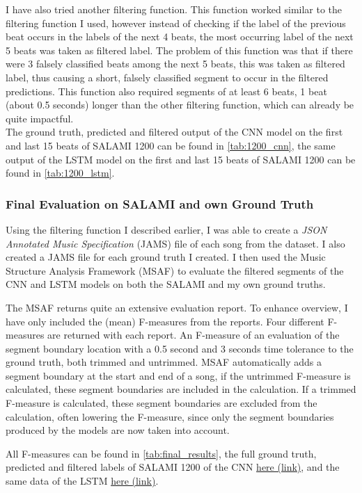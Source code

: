 I have also tried another filtering function. This function worked similar to the filtering function I used, however instead of checking if the label of the previous beat occurs in the labels of the next 4 beats, the most occurring label of the next 5 beats was taken as filtered label. The problem of this function was that if there were 3 falsely classified beats among the next 5 beats, this was taken as filtered label, thus causing a short, falsely classified segment to occur in the filtered predictions. This function also required segments of at least 6 beats, 1 beat (about 0.5 seconds) longer than the other filtering function, which can already be quite impactful.\\

The ground truth, predicted and filtered output of the CNN model on the first and last 15 beats of SALAMI 1200 can be found in \autoref{tab:1200_cnn}, the same output of the LSTM model on the first and last 15 beats of SALAMI 1200 can be found in \autoref{tab:1200_lstm}.

\subsubsection{Final Evaluation on SALAMI and own Ground Truth}
Using the filtering function I described earlier, I was able to create a \textit{JSON Annotated Music Specification} (JAMS) file \cite{Humphrey2014jams} of each song from the dataset. I also created a JAMS file for each ground truth I created. I then used the Music Structure Analysis Framework (MSAF) \cite{Nieto2016systematic} to evaluate the filtered segments of the CNN and LSTM models on both the SALAMI and my own ground truths.

The MSAF returns quite an extensive evaluation report. To enhance overview, I have only included the (mean) F-measures from the reports. Four different F-measures are returned with each report. An F-measure of an evaluation of the segment boundary location with a 0.5 second and 3 seconds time tolerance to the ground truth, both trimmed and untrimmed. MSAF automatically adds a segment boundary at the start and end of a song, if the untrimmed F-measure is calculated, these segment boundaries are included in the calculation. If a trimmed F-measure is calculated, these segment boundaries are excluded from the calculation, often lowering the F-measure, since only the segment boundaries produced by the models are now taken into account.

All F-measures can be found in \autoref{tab:final_results}, the full ground truth, predicted and filtered labels of SALAMI 1200 of the CNN \href{https://git.science.uu.nl/l.m.vanboven/bachelor-scriptie-musical-sctructure-analysis/-/blob/master/Leander/Results_Analysis/1200_cnn.csv}{here (link)}, and the same data of the LSTM \href{https://git.science.uu.nl/l.m.vanboven/bachelor-scriptie-musical-sctructure-analysis/-/blob/master/Leander/Results_Analysis/1200_lstm.csv}{here (link)}.